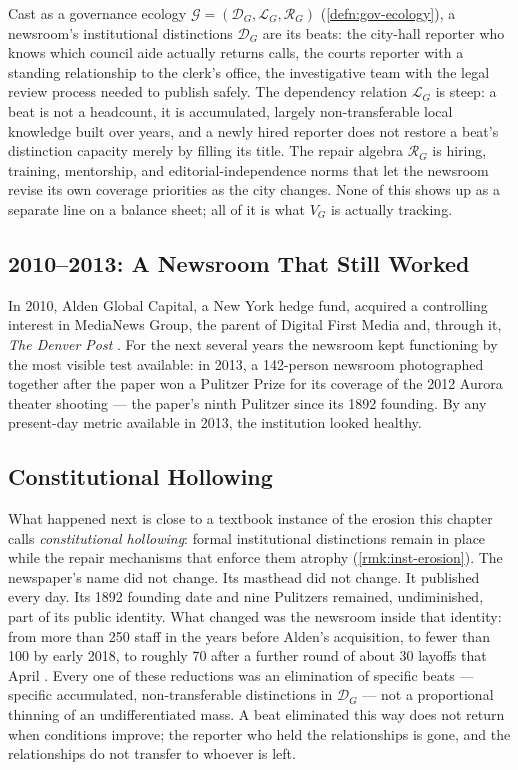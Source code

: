 \documentclass[12pt,twoside,openright]{book}
\begin{document}
Cast as a governance ecology $\mathcal{G} = (\mathcal{D}_G,
\mathcal{L}_G, \mathcal{R}_G)$ (\cref{defn:gov-ecology}), a
newsroom's institutional distinctions $\mathcal{D}_G$ are its
beats: the city-hall reporter who knows which council aide
actually returns calls, the courts reporter with a standing
relationship to the clerk's office, the investigative team with
the legal review process needed to publish safely. The
dependency relation $\mathcal{L}_G$ is steep: a beat is not a
headcount, it is accumulated, largely non-transferable local
knowledge built over years, and a newly hired reporter does not
restore a beat's distinction capacity merely by filling its
title. The repair algebra $\mathcal{R}_G$ is hiring, training,
mentorship, and editorial-independence norms that let the
newsroom revise its own coverage priorities as the city changes.
None of this shows up as a separate line on a balance sheet; all
of it is what $V_G$ is actually tracking.

\subsection{2010--2013: A Newsroom That Still Worked}

In 2010, Alden Global Capital, a New York hedge fund, acquired a
controlling interest in MediaNews Group, the parent of Digital
First Media and, through it, \emph{The Denver Post}
\parencite{npr2018denverpost}. For the next several years the
newsroom kept functioning by the most visible test available: in
2013, a 142-person newsroom photographed together after the
paper won a Pulitzer Prize for its coverage of the 2012 Aurora
theater shooting --- the paper's ninth Pulitzer since its 1892
founding. By any present-day metric available in 2013, the
institution looked healthy.

\subsection{Constitutional Hollowing}

What happened next is close to a textbook instance of the
erosion this chapter calls \emph{constitutional hollowing}: formal
institutional distinctions remain in place while the repair
mechanisms that enforce them atrophy (\cref{rmk:inst-erosion}).
The newspaper's name did not change. Its masthead did not
change. It published every day. Its 1892 founding date and nine
Pulitzers remained, undiminished, part of its public identity.
What changed was the newsroom inside that identity: from more
than 250 staff in the years before Alden's acquisition, to fewer
than 100 by early 2018, to roughly 70 after a further round of
about 30 layoffs that April \parencite{npr2018denverpost}. Every
one of these reductions was an elimination of specific beats ---
specific accumulated, non-transferable distinctions in
$\mathcal{D}_G$ --- not a proportional thinning of an undifferentiated
mass. A beat eliminated this way does not return when conditions
improve; the reporter who held the relationships is gone, and
the relationships do not transfer to whoever is left.
\end{document}

